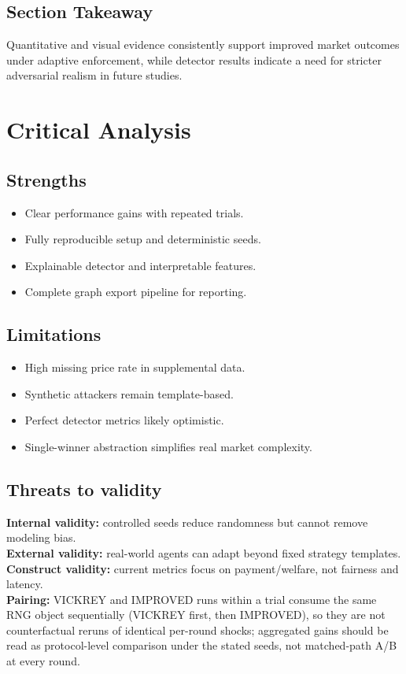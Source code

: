 \documentclass[journal]{IEEEtran}
\begin{document}
\subsection{Section Takeaway}
Quantitative and visual evidence consistently support improved market outcomes under adaptive enforcement, while detector results indicate a need for stricter adversarial realism in future studies.

\section{Critical Analysis}
\subsection{Strengths}
\begin{itemize}[leftmargin=*]
    \item Clear performance gains with repeated trials.
    \item Fully reproducible setup and deterministic seeds.
    \item Explainable detector and interpretable features.
    \item Complete graph export pipeline for reporting.
\end{itemize}

\subsection{Limitations}
\begin{itemize}[leftmargin=*]
    \item High missing price rate in supplemental data.
    \item Synthetic attackers remain template-based.
    \item Perfect detector metrics likely optimistic.
    \item Single-winner abstraction simplifies real market complexity.
\end{itemize}

\subsection{Threats to validity}
\textbf{Internal validity:} controlled seeds reduce randomness but cannot remove modeling bias.\\
\textbf{External validity:} real-world agents can adapt beyond fixed strategy templates.\\
\textbf{Construct validity:} current metrics focus on payment/welfare, not fairness and latency.\\
\textbf{Pairing:} VICKREY and IMPROVED runs within a trial consume the same RNG object sequentially (VICKREY first, then IMPROVED), so they are not counterfactual reruns of identical per-round shocks; aggregated gains should be read as protocol-level comparison under the stated seeds, not matched-path A/B at every round.
\end{document}
